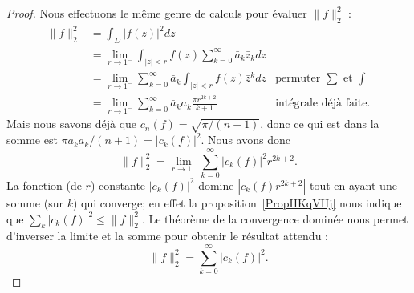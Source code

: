 \begin{proof}
	Nous effectuons le même genre de calculs pour évaluer \( \| f \|^2_2\) :
	\begin{subequations}
		\begin{align}
			\| f \|_2^2 & =\int_D| f(z) |^2dz                                                                                                \\
			            & =\lim_{r\to 1^-}\int_{| z |<r}f(z)\sum_{k=0}^{\infty}\bar a_k\bar z_kdz                                            \\
			            & =\lim_{r\to 1^-}\sum_{k=0}^{\infty}\bar a_k\int_{| z |<r}f(z)\bar z^kdz    & \text{permuter } \sum\text{ et } \int \\
			            & =\lim_{r\to 1^-}\sum_{k=0}^{\infty}\bar a_ka_k\frac{ \pi r^{2k+2} }{ k+1 } & \text{intégrale déjà faite}.
		\end{align}
	\end{subequations}
	Mais nous savons déjà que \( c_n(f)=\sqrt{\pi/(n+1)}\), donc ce qui est dans la somme est \( \pi\bar a_ka_k/(n+1)=| c_k(f) |^2\). Nous avons donc
	\begin{equation}
		\| f \|^2_2=\lim_{r\to 1^-}\sum_{k=0}^{\infty}| c_k(f) |^2 r^{2k+2}.
	\end{equation}
	La fonction (de \( r\)) constante \( | c_k(f) |^2\) domine \( | c_k(f)r^{2k+2} |\) tout en ayant une somme (sur \( k\)) qui converge; en effet la proposition~\ref{PropHKqVHj} nous indique que \( \sum_k| c_k(f) |^2\leq \| f \|_2^2\). Le théorème de la convergence dominée nous permet d'inverser la limite et la somme pour obtenir le résultat attendu :
	\begin{equation}
		\| f \|_2^2=\sum_{k=0}^{\infty}| c_k(f) |^2.
	\end{equation}
\end{proof}

